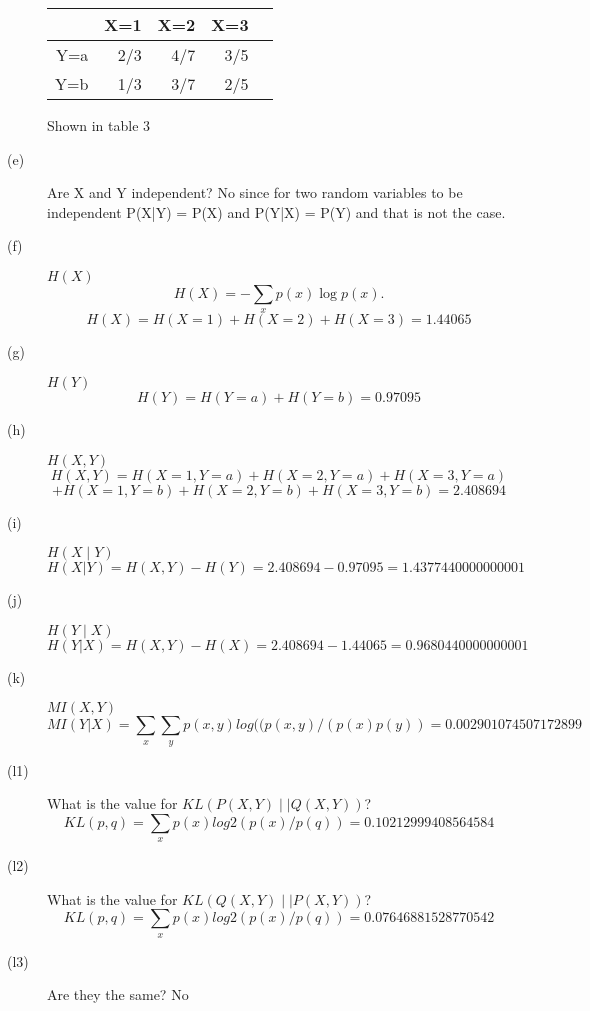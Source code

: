 \documentclass[11pt]{article}
\begin{document}
\begin{description}
\begin{table}
\begin{tabular}{|r|r|r|r|r|}
    & X=1 & X=2 & X=3 \\ \hline
Y=a & 2/3 & 4/7 &  3/5 \\ \hline 
Y=b & 1/3 & 3/7 &  2/5 \\ \hline
    \end{tabular}
    \end{table}
    Shown in table 3
   \item [(e)]Are X and Y independent? No since for two random variables to be independent P(X|Y) = P(X) and P(Y|X) = P(Y) and that is not the case. 
   \item [(f)]$H(X)$
    \begin{equation}
      H(X) = -\displaystyle\sum_{x} p(x)\log p(x).
    \end{equation}
    \begin{equation}
     H(X) = H(X=1)+H(X=2)+H(X=3) = 1.44065
   \end{equation}
   \item [(g)]$H(Y)$
   \begin{equation}
     H(Y) = H(Y=a)+H(Y=b) = 0.97095
    \end{equation}
   \item [(h)]$H(X,Y)$
   \begin{equation}
     H(X,Y) = H(X=1,Y=a)+H(X=2,Y=a)+H(X=3,Y=a)
   \end{equation}
\begin{equation}
+H(X=1,Y=b)+H(X=2,Y=b)+H(X=3,Y=b) = 2.408694
\end{equation}
   \item [(i)]$H(X \mid Y)$
	   \begin{equation}
     H(X|Y) = H(X,Y) - H(Y) = 2.408694-0.97095 = 1.4377440000000001
   \end{equation}
   \item [(j)]$H(Y \mid X)$
	   \begin{equation}
     H(Y|X) =  H(X,Y) - H(X) = 2.408694 - 1.44065= 0.9680440000000001
   \end{equation}
   \item [(k)]$MI(X,Y)$
   \begin{equation}
     MI(Y|X) = \displaystyle\sum_{x}\sum_{y}p(x,y)log((p(x,y)/(p(x)p(y)) = 0.002901074507172899
   \end{equation}
   \item [(l1)]What is the value for $KL(P(X,Y) \mid\mid Q(X,Y))$?
      \begin{equation}
     KL(p,q) = \displaystyle\sum_{x}p(x)log2(p(x)/p(q))= 0.10212999408564584
   \end{equation}
   \item [(l2)]What is the value for $KL(Q(X,Y) \mid\mid P(X,Y))$? 
      \begin{equation}
     KL(p,q) = \displaystyle\sum_{x}p(x)log2(p(x)/p(q))= 0.07646881528770542
   \end{equation}
   \item [(l3)]Are they the same? No
  \end{description}
\end{document}
